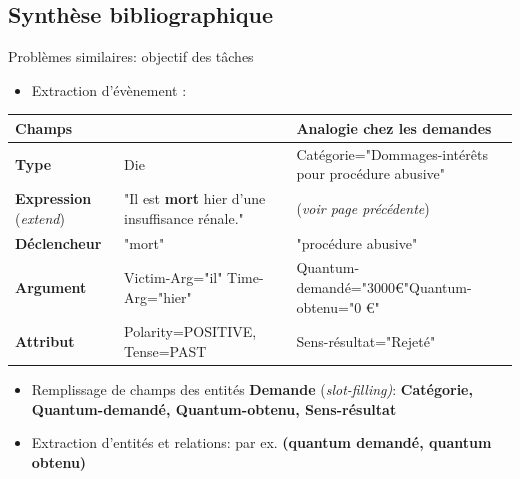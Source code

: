 \documentclass[newPxFont,pagenumber]{beamer}
\begin{document}
\subsection{Synthèse bibliographique}
\begin{frame}{Problèmes similaires: objectif des tâches}
\begin{itemize}
\item Extraction d'évènement : 
\end{itemize}
\begin{table}
\scriptsize
\begin{tabular}{|p{}|p{}|p{}|}
\hline
\textbf{Champs} & \textbf{\cite{ace2005event}} & \textbf{Analogie chez les demandes} \\ \hline
\textbf{Type} &  Die & Catégorie="Dommages-intérêts pour procédure abusive" \\ \hline
\textbf{Expression} (\textit{extend}) & "Il est \textbf{mort} hier d'une insuffisance rénale."  & (\textit{voir page précédente}) \\ \hline
\textbf{Déclencheur} & "mort" & "procédure abusive"\\ \hline
\textbf{Argument} & Victim-Arg="il" \linebreak Time-Arg="hier"  & Quantum-demandé="3000€"\linebreak  Quantum-obtenu="0 €"\ \\ \hline
\textbf{Attribut} & Polarity=POSITIVE, Tense=PAST & Sens-résultat="Rejeté" \\ \hline
\end{tabular}
\end{table}
\begin{itemize}
\item Remplissage de champs des entités \textbf{Demande} (\textit{slot-filling)}: \textbf{Catégorie, Quantum-demandé, Quantum-obtenu, Sens-résultat}
\item Extraction d'entités et relations: par ex. \textbf{(quantum demandé, quantum obtenu)}
\end{itemize}
\end{frame}

%
\end{document}
